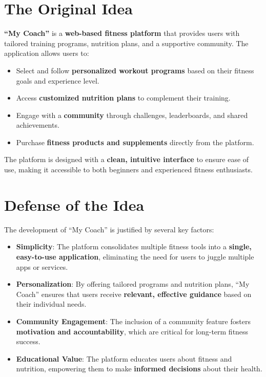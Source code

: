 \documentclass[12pt,a4paper]{report}
\begin{document}
\section{The Original Idea}
\textbf{``My Coach''} is a \textbf{web-based fitness platform} that provides users with tailored training programs, nutrition plans, and a supportive community. The application allows users to:
\begin{itemize}
    \item Select and follow \textbf{personalized workout programs} based on their fitness goals and experience level.
    \item Access \textbf{customized nutrition plans} to complement their training.
    \item Engage with a \textbf{community} through challenges, leaderboards, and shared achievements.
    \item Purchase \textbf{fitness products and supplements} directly from the platform.
\end{itemize}

The platform is designed with a \textbf{clean, intuitive interface} to ensure ease of use, making it accessible to both beginners and experienced fitness enthusiasts.

\section{Defense of the Idea}
The development of ``My Coach'' is justified by several key factors:
\begin{itemize}
    \item \textbf{Simplicity}: The platform consolidates multiple fitness tools into a \textbf{single, easy-to-use application}, eliminating the need for users to juggle multiple apps or services.
    \item \textbf{Personalization}: By offering tailored programs and nutrition plans, ``My Coach'' ensures that users receive \textbf{relevant, effective guidance} based on their individual needs.
    \item \textbf{Community Engagement}: The inclusion of a community feature fosters \textbf{motivation and accountability}, which are critical for long-term fitness success.
    \item \textbf{Educational Value}: The platform educates users about fitness and nutrition, empowering them to make \textbf{informed decisions} about their health.
\end{itemize}
\end{document}
